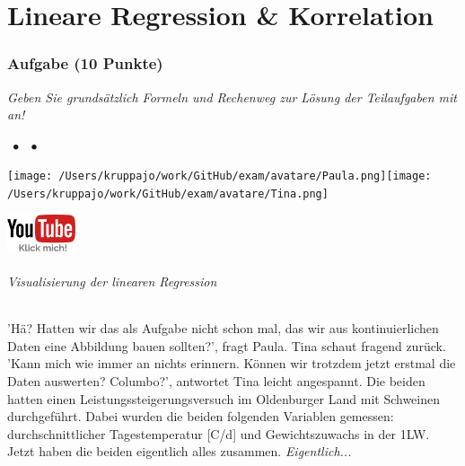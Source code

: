 \documentclass[a4paper, 9pt]{scrartcl}\usepackage[]{graphicx}\usepackage[]{xcolor}
\begin{document}
\part{Lineare Regression \& Korrelation}

\section{Aufgabe \hfill (10 Punkte)}

\textit{Geben Sie grundsätzlich Formeln und Rechenweg zur Lösung der Teilaufgaben mit an!} \\[1Ex]
 

 
\ifcollection
\begin{flushright}
\tiny\vspace{-3Ex}
\textbf{\examinhaltstart}
\exammodulestat $\;\bullet$
\exammodulestatbbv $\;\bullet$
\exammodulestatversuch 
\vspace{-4Ex}
\end{flushright}
\begin{minipage}[t]{0.5\textwidth}
\texttt{[image: /Users/kruppajo/work/GitHub/exam/avatare/Paula.png]}\hspace{-4mm}\texttt{[image: /Users/kruppajo/work/GitHub/exam/avatare/Tina.png]}
\end{minipage}
\begin{minipage}[t]{0.5\textwidth}
\hfill
\href{https://youtu.be/LtbC_K9V5wU}{\includegraphics[width = 2cm]{img/youtube}}
\end{minipage}
\fi



\ifcollection
\paragraph{Visualisierung der linearen Regression}
\fi

'Hä? Hatten wir das als Aufgabe nicht schon mal, das wir aus kontinuierlichen Daten eine Abbildung bauen sollten?', fragt Paula. Tina schaut fragend zurück. 'Kann mich wie immer an nichts erinnern. Können wir trotzdem jetzt erstmal die Daten auswerten? Columbo?', antwortet Tina leicht angespannt. Die beiden hatten einen Leistungssteigerungsversuch im Oldenburger Land mit Schweinen durchgeführt. Dabei wurden die beiden folgenden Variablen gemessen: durchschnittlicher Tagestemperatur [C/d] und Gewichtszuwachs in der 1LW. Jetzt haben die beiden eigentlich alles zusammen. \textit{Eigentlich...}
\end{document}
